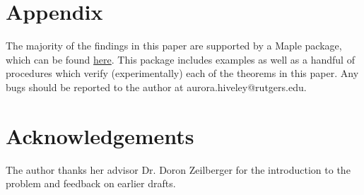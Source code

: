 \documentclass[article]{amsart}
\theoremstyle{definition}
\theoremstyle{definition}
\theoremstyle{remark}
\begin{document}
\section*{Appendix} \label{sec:appen}
The majority of the findings in this paper are supported by a Maple package, which can be found \href{https://aurorahiveley.github.io/wordle.txt}{here}. This package includes examples as well as a handful of procedures which verify (experimentally) each of the theorems in this paper. Any bugs should be reported to the author at aurora.hiveley@rutgers.edu.



\section*{Acknowledgements}
The author thanks her advisor Dr. Doron Zeilberger for the introduction to the problem and feedback on earlier drafts. 





\end{document}
